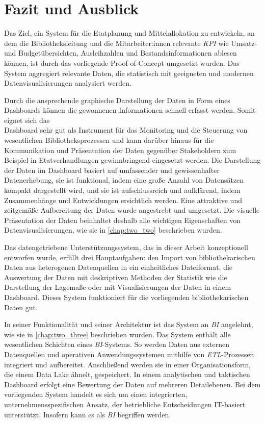 
\chapter{Fazit und Ausblick}
\label{chap:six}
Das Ziel, ein System für die Etatplanung und Mittelallokation zu entwickeln, an dem die
Bibliotheksleitung und die Mitarbeiter:innen relevante \textit{\acrlong{KPI}} wie Umsatz- und Budgetübersichten, 
Ausleihzahlen und Bestandsinformationen ablesen können, ist durch das vorliegende Proof-of-Concept umgesetzt wurden. Das System aggregiert relevante Daten, die statistisch mit geeigneten und
modernen Datenvisualisierungen analysiert werden.

Durch die ansprechende graphische Darstellung der Daten in Form eines Dashboards können die gewonnenen Informationen schnell erfasst werden.
Somit eignet sich das\\ Dashboard sehr gut als Instrument für das Monitoring und die Steuerung von wesentlichen Bibliotheksprozessen 
und kann darüber hinaus für die Kommunikation und Präsentation der Daten gegenüber Stakeholdern zum Beispiel in Etatverhandlungen gewinnbringend 
eingesetzt werden. Die Darstellung der Daten im Dashboard basiert auf umfassender und gewissenhafter Datenerhebung, 
sie ist funktional, indem eine große Anzahl von Datensätzen kompakt dargestellt wird, und sie ist 
aufschlussreich und aufklärend, indem Zusammenhänge und Entwicklungen ersichtlich werden. 
Eine attraktive und zeitgemäße Aufbereitung der Daten wurde angestrebt und umgesetzt. 
Die visuelle Präsentation der Daten beinhaltet deshalb alle wichtigen Eigenschaften von Datenvisualisierungen, 
wie sie in \autoref{chap:two_two} beschrieben wurden.

Das datengetriebene Unterstützungssystem, das in dieser Arbeit konzeptionell entworfen wurde, erfüllt drei Hauptaufgaben:
den Import von bibliothekarischen Daten aus heterogenen Datenquellen in ein einheitliches Dateiformat, die Auswertung der Daten mit deskriptiven Methoden der Statistik
wie die Darstellung der Lagemaße oder mit Visualisierungen der Daten in einem Dashboard.
Dieses System funktioniert für die vorliegenden bibliothekarischen Daten gut. 

In seiner Funktionalität und seiner Architektur ist das 
System an \textit{\acrlong{BI}} angelehnt, wie sie in  \autoref{chap:two_three} beschrieben wurden. 
Das System enthält alle wesentlichen Schichten eines \textit{\acrshort{BI}}-Systems. So werden Daten aus externen Datenquellen und
operativen Anwendungssystemen mithilfe von \textit{\acrshort{ETL}}-Prozessen integriert und aufbereitet.
Anschließend werden sie in einer Organisationsform, die einem Data Lake ähnelt, gespeichert. 
In einem analytischen und taktischen Dashboard erfolgt eine Bewertung der Daten auf mehreren Detailebenen. 
Bei dem vorliegenden System handelt es sich um einen integrierten, unternehmensspezifischen Ansatz, 
der betriebliche Entscheidungen IT-basiert unterstützt. Insofern kann es als \textit{\acrlong{BI}} begriffen werden.

